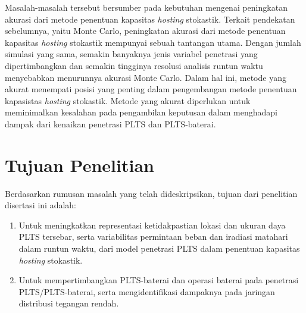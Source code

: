 
Masalah-masalah tersebut bersumber pada kebutuhan mengenai peningkatan akurasi dari metode penentuan kapasitas \textit{hosting} stokastik. Terkait pendekatan sebelumnya, yaitu Monte Carlo, peningkatan akurasi dari metode penentuan kapasitas \textit{hosting} stokastik mempunyai sebuah tantangan utama. Dengan jumlah simulasi yang sama, semakin banyaknya jenis variabel penetrasi yang dipertimbangkan dan semakin tingginya resolusi analisis runtun waktu menyebabkan menurunnya akurasi Monte Carlo. Dalam hal ini, metode yang akurat menempati posisi yang penting dalam pengembangan metode penentuan kapasistas \textit{hosting} stokastik. Metode yang akurat diperlukan untuk meminimalkan kesalahan pada pengambilan keputusan dalam menghadapi dampak dari kenaikan penetrasi PLTS dan PLTS-baterai.

\section{Tujuan Penelitian}
Berdasarkan rumusan masalah yang telah dideskripsikan, tujuan dari penelitian disertasi ini adalah:
\begin{enumerate}
    \item Untuk meningkatkan representasi ketidakpastian lokasi dan ukuran daya PLTS tersebar, serta variabilitas permintaan beban dan iradiasi matahari dalam runtun waktu, dari model penetrasi PLTS dalam penentuan kapasitas \textit{hosting} stokastik.
    \item Untuk mempertimbangkan PLTS-baterai dan operasi baterai pada penetrasi PLTS/PLTS-baterai, serta mengidentifikasi dampaknya pada jaringan distribusi tegangan rendah.
\end{enumerate}

